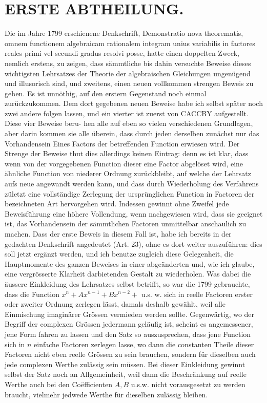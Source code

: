 \documentclass[10pt]{article}
\begin{document}
\section*{ERSTE ABTHEILUNG.}
Die im Jahre 1799 erschienene Denkschrift, Demonstratio nova theorematis, omnem functionem algebraicam rationalem integram unius variabilis in factores reales primi vel secundi gradus resolvi posse, hatte einen doppelten Zweck, nemlich erstens, zu zeigen, dass sämmtliche bis dahin versuchte Beweise dieses wichtigsten Lehrsatzes der Theorie der algebraischen Gleichungen ungenügend und illusorisch sind, und zweitens, einen neuen vollkommen strengen Beweis zu geben. Es ist unnöthig, auf den erstern Gegenstand noch einmal zurückzukommen. Dem dort gegebenen neuen Beweise habe ich selbst später noch zwei andere folgen lassen, und ein vierter ist zuerst von CACCBY aufgestellt. Diese vier Beweise beru-
hen alle auf eben so vielen verschiedenen Grundlagen, aber darin kommen sie alle überein, dass durch jeden derselben zunächst nur das Vorhandensein Eines Factors der betreffenden Function erwiesen wird. Der Strenge der Beweise thut dies allerdings keinen Eintrag: denn es ist klar, dass wenn von der vorgegebenen Function dieser eine Factor abgelöset wird, eine ähnliche Function von niederer Ordnung zurückbleibt, auf welche der Lehrsatz aufs neue angewandt werden kann, und dass durch Wiederholung des Verfahrens zületzt eine vollständige Zerlegung der ursprünglichen Function in Factoren der bezeichneten Art hervorgehen wird. Indessen gewinnt ohne Zweifel jede Beweisführung eine höhere Vollendung, wenn nachgewiesen wird, dass sie geeignet ist, das Vorhandensein der sämmtlichen Factoren unmittelbar anschaulich zu machen. Dass der erste Beweis in diesem Fall ist, habe ich bereits in der gedachten Denkschrift angedeutet (Art. 23), ohne es dort weiter auszuführen: dies soll jetzt ergänzt werden, und ich benutze zugleich diese Gelegenheit, die Hauptmomente des ganzen Beweises in einer abgeänderten und, wie ich glaube, eine vergrösserte Klarheit darbietenden Gestalt zu wiederholen. Was dabei die äussere Einkleidung des Lehrsatzes selbst betrifft, so war die 1799 gebrauchte, dass die Function \(x^{n}+A x^{n-1}+B x^{n-2}+\) u.s. w. sich in reelle Factoren erster oder zweiter Ordnung zerlegen lässt, damals deshalb gewählt, weil alle Einmischung imaginärer Grössen vermieden werden sollte. Gegenwärtig, wo der Begriff der complexen Grössen jedermann geläufig ist, scheint es angemessener, jene Form fahren zu lassen und den Satz so auszusprechen, dass jene Function sich in \(n\) einfache Factoren zerlegen lasse, wo dann die constanten Theile dieser Factoren nicht eben reelle Grössen zu sein brauchen, sondern für dieselben auch jede complexen Werthe zulässig sein müssen. Bei dieser Einkleidung gewinnt selbst der Satz noch an Allgemeinheit, weil dann die Beschränkung auf reelle Werthe auch bei den Coëfficienten \(A, B\) u.s.w. nicht vorausgesetzt zu werden braucht, vielmehr jedwede Werthe für dieselben zulässig bleiben.
\end{document}

